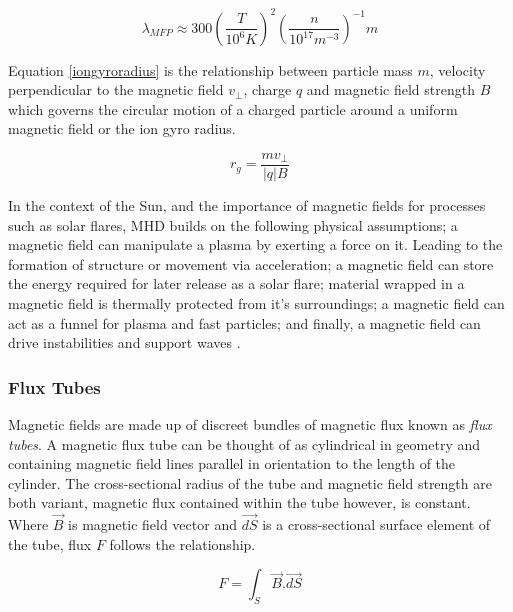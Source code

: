 \begin{equation}\label{meanfreepath}
\lambda_{MFP}\approx300(\frac{T}{10^{6}K})^{2}(\frac{n}{10^{17}m^{-3}})^{-1}m
\end{equation}

Equation \ref{iongyroradius} is the relationship between particle mass $m$, velocity perpendicular to the magnetic field $v_{\bot}$, charge $q$ and magnetic field strength $B$  which governs the circular motion of a charged particle around a uniform magnetic field or the ion gyro radius. 

\begin{equation}\label{iongyroradius}
r_{g}=\frac{mv_{\bot}}{|q|B}
\end{equation}

In the context of the Sun, and the importance of magnetic fields for processes such as solar flares, MHD builds on the following physical assumptions; a magnetic field can manipulate a plasma by exerting a force on it. Leading to the formation of structure or movement via acceleration; a magnetic field can store the energy required for later release as a solar flare; material wrapped in a magnetic field is thermally protected from it's surroundings; a magnetic field can act as a funnel for plasma and fast particles; and finally, a magnetic field can drive instabilities and support waves \citep{2003dysu.book.....D}.

\subsubsection{Flux Tubes}
Magnetic fields are made up of discreet bundles of magnetic flux known as \emph{flux tubes}. A magnetic flux tube can be thought of as cylindrical in geometry and containing magnetic field lines parallel in orientation to the length of the cylinder. The cross-sectional radius of the tube and magnetic field strength are both variant, magnetic flux contained within the tube however, is constant. Where $\vec{B}$ is magnetic field vector and $\vec{dS}$ is a cross-sectional surface element of the tube, flux $F$ follows the relationship.

\begin{equation}\label{fluxtube}       
F = \int_{S} \vec{B}.\vec{dS}
\end{equation}


